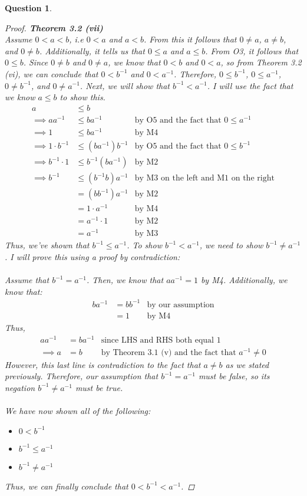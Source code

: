 \documentclass[10pt,a4paper]{article}
\newtheorem*{question*}{Question}
\theoremstyle{definition}
\begin{document}
\begin{question*}{$ $}
\begin{proof}{\textbf{Theorem 3.2 (vii)}}
\\Assume $0 < a < b$, i.e $0 < a$ and $a < b$. From this it follows that $0 \neq a$, $a \neq b$, and $0 \neq b$. Additionally, it tells us that $0 \leq a$ and $a \leq b$. From O3, it follows that $0 \leq b$. Since $0 \neq b$ and $0 \neq a$, we know that $0 < b$ and $0 < a$, so from Theorem 3.2 (vi), we can conclude that $0 < b^{-1}$ and $0 < a^{-1}$. Therefore, $0 \leq b^{-1}$, $0 \leq a^{-1}$, $0 \neq b^{-1}$, and $0 \neq a^{-1}$. Next, we will show that $b^{-1} < a^{-1}$. I will use the fact that we know $a \leq b$ to show this. 
\begin{align*}
a &\leq b\\
\implies aa^{-1} &\leq ba^{-1} &\text{by O5 and the fact that } 0 \leq a^{-1}\\
\implies 1 &\leq ba^{-1} &\text{by M4}\\
\implies 1 \cdot b^{-1} &\leq (ba^{-1})b^{-1} &\text{by O5 and the fact that } 0 \leq b^{-1}\\
\implies b^{-1} \cdot 1 &\leq b^{-1}(ba^{-1}) &\text{by M2}\\
\implies b^{-1} &\leq (b^{-1}b)a^{-1} &\text{by M3 on the left and M1 on the right}\\
&= (bb^{-1})a^{-1} &\text{by M2}\\
&= 1 \cdot a^{-1} &\text{by M4}\\
&= a^{-1} \cdot 1 &\text{by M2}\\
&= a^{-1} &\text{by M3}
\end{align*}
Thus, we've shown that $b^{-1} \leq a^{-1}$. To show $b^{-1} < a^{-1}$, we need to show $b^{-1} \neq a^{-1}$. I will prove this using a proof by contradiction:
\\
\\Assume that $b^{-1} = a^{-1}$. Then, we know that $aa^{-1} = 1$ by M4. Additionally, we know that:
\begin{align*}
ba^{-1} &= bb^{-1} &\text{by our assumption}\\
&= 1 &\text{by M4}
\end{align*}
Thus,
\begin{align*}
aa^{-1} &= ba^{-1} &\text{since LHS and RHS both equal 1}\\
\implies a &= b &\text{by Theorem 3.1 (v) and the fact that } a^{-1} \neq 0
\end{align*}
However, this last line is contradiction to the fact that $a \neq b$ as we stated previously. Therefore, our assumption that $b^{-1} = a^{-1}$ must be false, so its negation $b^{-1} \neq a^{-1}$ must be true.
\\
\\We have now shown all of the following:
\begin{itemize}
\item $0 < b^{-1}$
\item $b^{-1} \leq a^{-1}$
\item $b^{-1} \neq a^{-1}$
\end{itemize}
Thus, we can finally conclude that $0 < b^{-1} < a^{-1}$.
\end{proof}
\end{question*}
\end{document}

